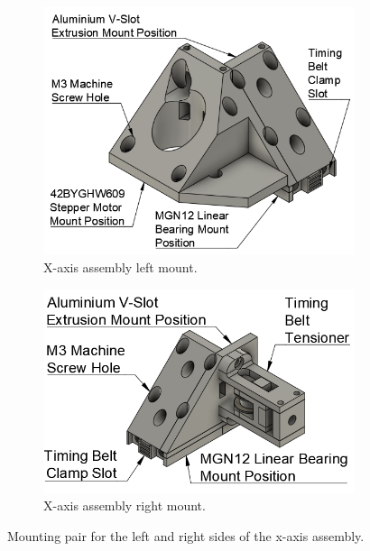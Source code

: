 \begin{figure}[!ht]
	\centering
	\begin{subfigure}{.49\textwidth}
		\centering
		\includegraphics[width=1\linewidth]{figures/x-axis-mount-left.png}
		\caption{X-axis assembly left mount.}
		\label{fig:x-axis-mount-left}
	\end{subfigure}%
	\begin{subfigure}{.49\textwidth}
		\centering
		\includegraphics[width=0.8\linewidth]{figures/x-axis-mount-right.png}
		\caption{X-axis assembly right mount.}
		\label{fig:x-axis-mount-right}
	\end{subfigure}%
	\caption{Mounting pair for the left and right sides of the x-axis assembly.}
	\label{fig:x-axis-assembly-mounts}
\end{figure}

